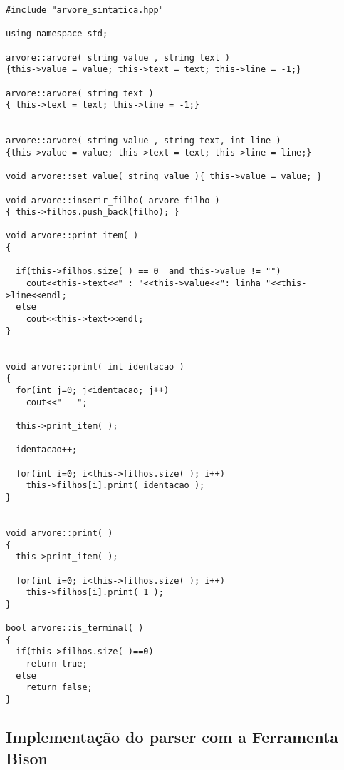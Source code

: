 \begin{lstlisting}
#include "arvore_sintatica.hpp"

using namespace std;

arvore::arvore( string value , string text )
{this->value = value; this->text = text; this->line = -1;}

arvore::arvore( string text )
{ this->text = text; this->line = -1;}


arvore::arvore( string value , string text, int line )
{this->value = value; this->text = text; this->line = line;}

void arvore::set_value( string value ){ this->value = value; }

void arvore::inserir_filho( arvore filho )
{ this->filhos.push_back(filho); }

void arvore::print_item( )
{

  if(this->filhos.size( ) == 0  and this->value != "")
    cout<<this->text<<" : "<<this->value<<": linha "<<this->line<<endl;
  else
    cout<<this->text<<endl;
}


void arvore::print( int identacao )
{
  for(int j=0; j<identacao; j++)
    cout<<"   ";

  this->print_item( );

  identacao++;

  for(int i=0; i<this->filhos.size( ); i++)
    this->filhos[i].print( identacao );
}


void arvore::print( )
{
  this->print_item( );

  for(int i=0; i<this->filhos.size( ); i++)
    this->filhos[i].print( 1 );
}

bool arvore::is_terminal( )
{
  if(this->filhos.size( )==0)
    return true;
  else
    return false;
}
\end{lstlisting}



\subsection{Implementação do parser com a Ferramenta Bison}

